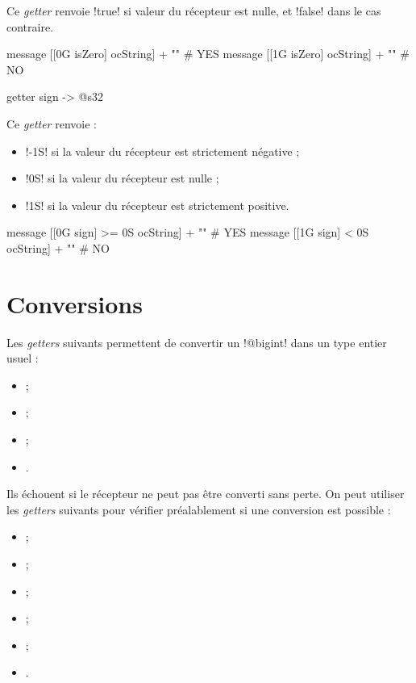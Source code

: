 Ce \emph{getter} renvoie \ggsq!true! si valeur du récepteur est nulle, et \ggsq!false! dans le cas contraire.

\begin{galgas4}
message [[0G isZero] ocString] + "\n" # YES
message [[1G isZero] ocString] + "\n" # NO
\end{galgas4}




\begin{galgas4box}
getter sign -> @s32
\end{galgas4box}

Ce \emph{getter} renvoie :
\begin{itemize}
\item \ggsq!-1S! si la valeur du récepteur est strictement négative ;
\item \ggsq!0S! si la valeur du récepteur est nulle ;
\item \ggsq!1S! si la valeur du récepteur est strictement positive.
\end{itemize}

\begin{galgas4}
message [[0G sign] >= 0S ocString] + "\n" # YES
message [[1G sign] < 0S ocString] + "\n" # NO
\end{galgas4}











\section{Conversions}


Les \emph{getters} suivants permettent de convertir un \ggsq!@bigint! dans un type entier usuel :
\begin{itemize}
  \item {} ;
  \item {} ;
  \item {} ;
  \item {}.
\end{itemize}

Ils échouent si le récepteur ne peut pas être converti sans perte. On peut utiliser les \emph{getters} suivants pour vérifier préalablement si une conversion est possible :
\begin{itemize}
  \item {} ;
  \item {} ;
  \item {} ;
  \item {} ;
  \item {} ;
  \item {}.
\end{itemize}

